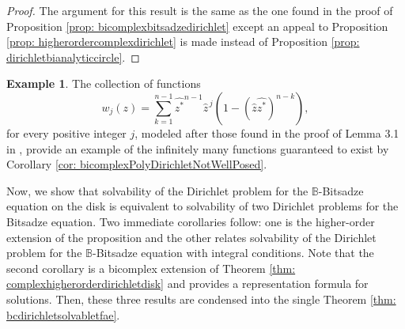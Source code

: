 \documentclass[12pt,reqno]{amsart}
\theoremstyle{definition}
\newtheorem{examp}[theorem]{Example}
\theoremstyle{remark}
\newcommand{\bc}{\mathbb{B}}
\begin{document}
            \begin{proof}
                The argument for this result is the same as the one found in the proof of Proposition \ref{prop: bicomplexbitsadzedirichlet} except an appeal to Proposition \ref{prop: higherordercomplexdirichlet} is made instead of Proposition \ref{prop: dirichletbianalyticcircle}.  
            \end{proof}

             \begin{examp}

            The collection of functions 
            \[
                w_j(z) = \sum_{k=1}^{n-1} \widehat{z^*}^{n-1} \widehat{z}^{\,j} (1-(\widehat{z}\widehat{z^*})^{n-k}),
            \]
            for every positive integer $j$, modeled after those found in the proof of Lemma 3.1 in \cite{Karaca20}, provide an example of the infinitely many functions guaranteed to exist by Corollary \ref{cor: bicomplexPolyDirichletNotWellPosed}.
            
            \end{examp}


            Now, we show that solvability of the Dirichlet problem for the $\bc$-Bitsadze equation on the disk is equivalent to solvability of two Dirichlet problems for the Bitsadze equation. Two immediate corollaries follow: one is the higher-order extension of the proposition and the other relates solvability of the Dirichlet problem for the $\bc$-Bitsadze equation with integral conditions. Note that the second corollary is a bicomplex extension of Theorem \ref{thm: complexhigherorderdirichletdisk} and provides a representation formula for solutions. Then, these three results are condensed into the single Theorem \ref{thm: bcdirichletsolvabletfae}.
\end{document}
